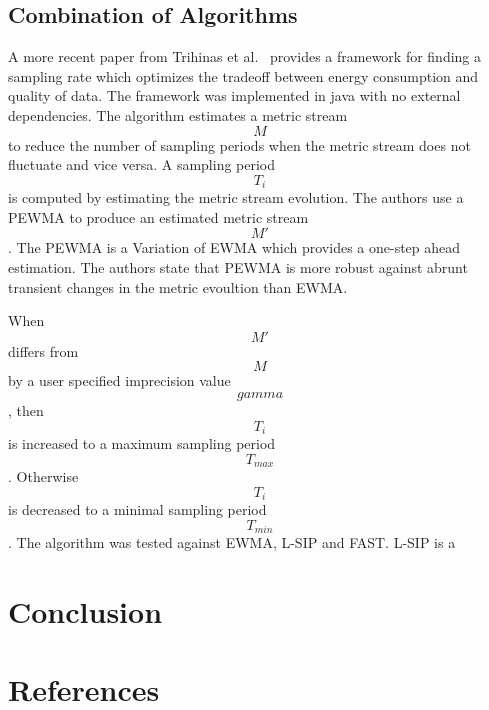 \subsection{Combination of Algorithms}
\label{sec:Listings}
A more recent paper from Trihinas et al.~\cite{trihinas2015adam} provides a
framework for finding a sampling rate which optimizes the tradeoff between
energy consumption and quality of data. The framework was implemented in java
with no external dependencies. The algorithm estimates a metric stream $$ M $$
to reduce the number of sampling periods when the metric stream does not
fluctuate and vice versa. A sampling period $$ T_i $$ is computed by estimating
the metric stream evolution. The authors use a \ac{PEWMA} to produce an
estimated metric stream $$ M' $$. The \ac{PEWMA} is a Variation of \ac{EWMA}
which provides a one-step ahead estimation. The authors state that \ac{PEWMA}
is more robust against abrunt transient changes in the metric evoultion than
\ac{EWMA}.

When $$ M' $$ differs from $$ M $$ by a user specified imprecision value $$
gamma $$, then $$ T_i $$ is increased to a maximum sampling period $$ T_{max}
$$. Otherwise $$ T_i $$ is decreased to a minimal sampling period $$ T_{min}
$$. The algorithm was tested against \ac{EWMA}, L-SIP and FAST. L-SIP is a  

\section{Conclusion}
\label{sec:Conclusion}


\section{References}
\label{sec:References}

